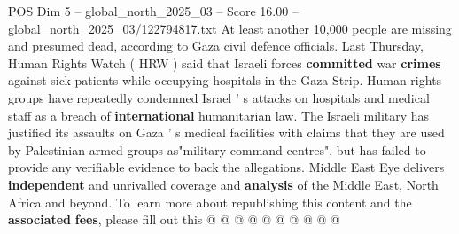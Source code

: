 \begin{textsample}{POS Dim 5 – global\_north\_2025\_03 – Score 16.00 – global\_north\_2025\_03/122794817.txt}
At least another 10,000 people are missing and presumed dead, according to Gaza civil defence officials.
Last Thursday, Human Rights Watch ( HRW ) said that Israeli forces \textbf{committed} war \textbf{crimes} against sick patients while occupying hospitals in the Gaza Strip.
Human rights groups have repeatedly condemned Israel ' s attacks on hospitals and medical staff as a breach of \textbf{international} humanitarian law.
The Israeli military has justified its assaults on Gaza ' s medical facilities with claims that they are used by Palestinian armed groups as"military command centres", but has failed to provide any verifiable evidence to back the allegations.
Middle East Eye delivers \textbf{independent} and unrivalled coverage and \textbf{analysis} of the Middle East, North Africa and beyond.
To learn more about republishing this content and the \textbf{associated} \textbf{fees}, please fill out this @ @ @ @ @ @ @ @ @ @

\end{textsample}
